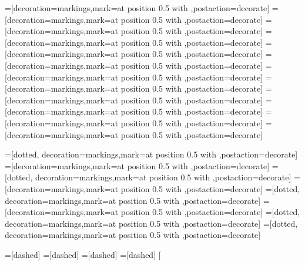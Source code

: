 {{{{%
=[decoration={markings,mark=at position 0.5 with \arrow{>}},postaction=decorate]
=[decoration={markings,mark=at position 0.5 with \arrow{<}},postaction=decorate]
=[decoration={markings,mark=at position 0.5 with \arrow{>}},postaction=decorate]
=[decoration={markings,mark=at position 0.5 with \arrow{<}},postaction=decorate]
=[decoration={markings,mark=at position 0.5 with \arrow{>}},postaction=decorate]
=[decoration={markings,mark=at position 0.5 with \arrow{<}},postaction=decorate]
=[decoration={markings,mark=at position 0.5 with \arrow{>}},postaction=decorate]
=[decoration={markings,mark=at position 0.5 with \arrow{<}},postaction=decorate]
=[decoration={markings,mark=at position 0.5 with \arrow{>}},postaction=decorate]
=[decoration={markings,mark=at position 0.5 with \arrow{<}},postaction=decorate]
=[decoration={markings,mark=at position 0.5 with \arrow{>}},postaction=decorate]
=[decoration={markings,mark=at position 0.5 with \arrow{<}},postaction=decorate]

=[dotted, decoration={markings,mark=at position 0.5 with \arrow{>}},postaction=decorate]
=[decoration={markings,mark=at position 0.5 with \arrow{<}},postaction=decorate]
=[dotted, decoration={markings,mark=at position 0.5 with \arrow{>}},postaction=decorate]
=[decoration={markings,mark=at position 0.5 with \arrow{<}},postaction=decorate]
=[dotted, decoration={markings,mark=at position 0.5 with \arrow{>}},postaction=decorate]
=[decoration={markings,mark=at position 0.5 with \arrow{<}},postaction=decorate]
=[dotted, decoration={markings,mark=at position 0.5 with \arrow{>}},postaction=decorate]
=[dotted, decoration={markings,mark=at position 0.5 with \arrow{>}},postaction=decorate]

=[dashed]
=[dashed]
=[dashed]
=[dashed]
[%


}}}}
